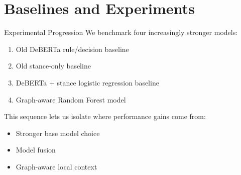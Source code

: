 \documentclass[aspectratio=169]{beamer}
\begin{document}
\section{Baselines and Experiments}

\begin{frame}{Experimental Progression}
We benchmark four increasingly stronger models:
\begin{enumerate}
  \item Old DeBERTa rule/decision baseline
  \item Old stance-only baseline
  \item DeBERTa + stance logistic regression baseline
  \item Graph-aware Random Forest model
\end{enumerate}

This sequence lets us isolate where performance gains come from:
\begin{itemize}
  \item Stronger base model choice
  \item Model fusion
  \item Graph-aware local context
\end{itemize}
\end{frame}
\end{document}
